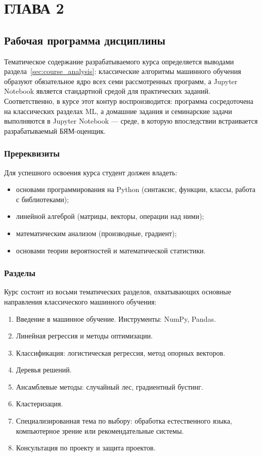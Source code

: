 \chapter*{ГЛАВА 2}
\sloppy

\section{Рабочая программа дисциплины}

Тематическое содержание разрабатываемого курса определяется выводами
раздела~\ref{sec:course_analysis}: классические алгоритмы машинного обучения
образуют обязательное ядро всех семи рассмотренных программ, а Jupyter
Notebook является стандартной средой для практических заданий. Соответственно,
в курсе этот контур воспроизводится: программа сосредоточена на классических
разделах ML, а домашние задания и семинарские задачи выполняются в Jupyter
Notebook --- среде, в которую впоследствии встраивается разрабатываемый
БЯМ-оценщик.

\subsection{Пререквизиты}

Для успешного освоения курса студент должен владеть:

\begin{itemize}
    \item основами программирования на Python (синтаксис, функции, классы, работа с библиотеками);
    \item линейной алгеброй (матрицы, векторы, операции над ними);
    \item математическим анализом (производные, градиент);
    \item основами теории вероятностей и математической статистики.
\end{itemize}

\subsection{Разделы}

Курс состоит из восьми тематических разделов, охватывающих основные направления классического машинного обучения:

\begin{enumerate}
    \item Введение в машинное обучение. Инструменты: NumPy, Pandas.
    \item Линейная регрессия и методы оптимизации.
    \item Классификация: логистическая регрессия, метод опорных векторов.
    \item Деревья решений.
    \item Ансамблевые методы: случайный лес, градиентный бустинг.
    \item Кластеризация.
    \item Специализированная тема по выбору: обработка естественного языка, компьютерное зрение или рекомендательные системы.
    \item Консультация по проекту и защита проектов.
\end{enumerate}

